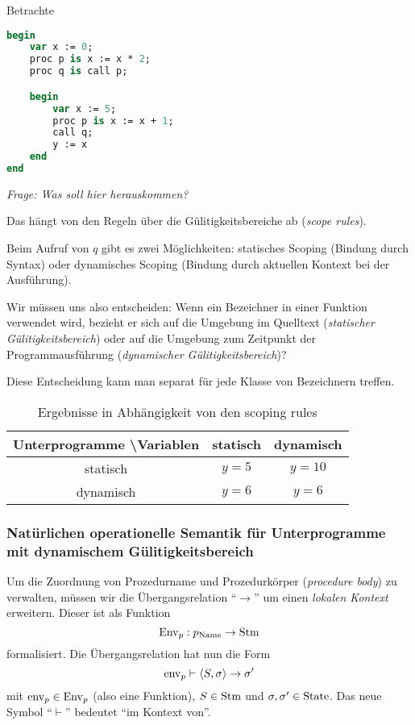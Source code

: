 \par\medskip
\begin{example}
Betrachte
\begin{lstlisting}[language=Pascal, caption=Programm mit Unterprogrammen]
begin
    var x := 0;
    proc p is x := x * 2;
    proc q is call p;

    begin
        var x := 5;
        proc p is x := x + 1;
        call q;
        y := x
    end
end
\end{lstlisting}

\emph{Frage: Was soll hier herauskommen?}

Das hängt von den Regeln über die Gülitigkeitsbereiche ab (\emph{scope rules}).

Beim Aufruf von $q$ gibt es zwei Möglichkeiten: statisches Scoping (Bindung durch Syntax) oder dynamisches Scoping (Bindung durch aktuellen Kontext bei der Ausführung).

Wir müssen uns also entscheiden: Wenn ein Bezeichner in einer Funktion verwendet wird, bezieht er sich auf die Umgebung im Quelltext (\emph{statischer Gülitigkeitsbereich}) oder auf die Umgebung zum Zeitpunkt der Programmausführung (\emph{dynamischer Gülitigkeitsbereich})?

Diese Entscheidung kann man separat für jede Klasse von Bezeichnern treffen.
\end{example}

\begin{table}[H]
    \centering
    \begin{tabular}{c||c|c}
        Unterprogramme \textbackslash Variablen & statisch & dynamisch \\ \hline \hline
        statisch  & $y = 5$ & $y = 10$ \\ \hline
        dynamisch & $y = 6$ & $y = 6$
    \end{tabular}
    \caption{Ergebnisse in Abhängigkeit von den scoping rules}
\end{table}



\subsubsection{Natürlichen operationelle Semantik für Unterprogramme mit dynamischem Gülitigkeitsbereich}

Um die Zuordnung von Prozedurname und Prozedurkörper (\emph{procedure body}) zu verwalten, müssen wir die Übergangsrelation ``$\to$'' um einen \emph{lokalen Kontext} erweitern. Dieser ist als Funktion \[
\operatorname{Env}_p: p_{\text{Name}} \to \operatorname{Stm}
\] formalisiert. Die Übergangsrelation hat nun die Form \[
    \operatorname{env}_p \vdash \langle S, \sigma \rangle \to \sigma'
\] mit $\operatorname{env}_p \in \operatorname{Env}_p$ (also eine Funktion), $S \in \operatorname{Stm}$ und $\sigma, \sigma' \in \operatorname{State}$. Das neue Symbol ``$\vdash$'' bedeutet ``im Kontext von''.

